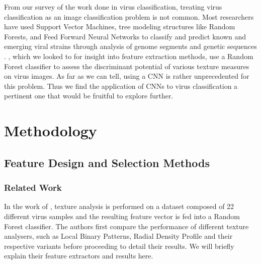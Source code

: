 \begin{multicols}{2}
From our survey of the work done in virus classification, treating virus classification as an image classification problem is not common. Most researchers have used Support Vector Machines, tree modeling structures like Random Forests, and Feed Forward Neural Networks to classify and predict known and emerging viral strains through analysis of genome segments and genetic sequences \citet{work_A} \citet{work_B} \citet{work_C}. \citet{kylberg2011virus}, which we looked to for insight into feature extraction methods, use a Random Forest classifier to assess the discriminant potential of various texture measures on virus images. As far as we can tell, using a CNN is rather unprecedented for this problem. Thus we find the application of CNNs to virus classification a pertinent one that would be fruitful to explore further.

\section{Methodology}

\subsection{Feature Design and Selection Methods}

\subsubsection{Related Work}
In the work of \citet{kylberg2011virus}, texture analysis is performed on a dataset composed of 22 different  virus samples and the resulting feature vector is fed into a Random Forest classifier. The authors first compare the performance of different texture analysers, such as Local Binary Patterns, Radial Density Profile and their respective variants before proceeding to detail their results. We will briefly explain their feature extractors and results here. 

\end{multicols}
